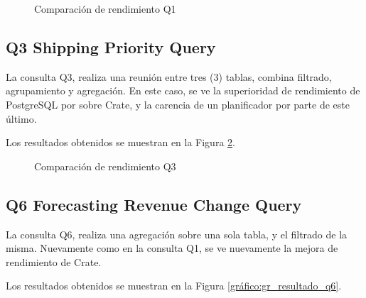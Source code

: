 \documentclass[11pt, twocolumns]{article}
\begin{document}
\begin{multicols}{2}
\begin{figure}[H]
    \caption{Comparación de rendimiento Q1}
	\label{gráfico:gr_resultado_q1}
\end{figure}

\subsection{Q3 Shipping Priority Query}
La consulta Q3, realiza una reunión entre tres (3) tablas, combina filtrado, agrupamiento y agregación. En este caso, se ve la superioridad de rendimiento de PostgreSQL por sobre Crate, y la carencia de un planificador por parte de este último.
\par
Los resultados obtenidos se muestran en la Figura \ref{gráfico:gr_resultado_q3}.

\begin{figure}[H]
    \caption{Comparación de rendimiento Q3}
	\label{gráfico:gr_resultado_q3}
\end{figure}


\subsection{Q6 Forecasting Revenue Change Query}
La consulta Q6, realiza una agregación sobre una sola tabla, y el filtrado de la misma. Nuevamente como en la consulta Q1, se ve nuevamente la mejora de rendimiento de Crate.
\par
Los resultados obtenidos se muestran en la Figura \ref{gráfico:gr_resultado_q6}.


\end{multicols}
\end{document}
